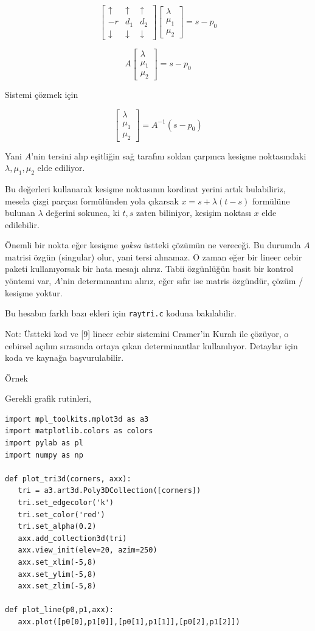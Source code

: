 \documentclass[12pt,fleqn]{article}\usepackage{../../common}
\begin{document}
$$
\left[\begin{array}{ccc}
\uparrow & \uparrow & \uparrow  \\
 -r & d_1 & d_2 \\
\downarrow & \downarrow & \downarrow 
\end{array}\right]
\left[\begin{array}{ccc}
\lambda \\ \mu_1 \\ \mu_2 
\end{array}\right] = s - p_0
$$

$$
A
\left[\begin{array}{ccc}
\lambda \\ \mu_1 \\ \mu_2 
\end{array}\right] = s - p_0
$$

Sistemi çözmek için

$$
\left[\begin{array}{ccc}
\lambda \\ \mu_1 \\ \mu_2 
\end{array}\right] = A^{-1} (s - p_0)
$$

Yani $A$'nin tersini alıp eşitliğin sağ tarafını soldan çarpınca kesişme
noktasındaki $\lambda,\mu_1,\mu_2$ elde ediliyor.

Bu değerleri kullanarak kesişme noktasının kordinat yerini artık bulabiliriz,
mesela çizgi parçası formülünden yola çıkarsak $x = s + \lambda (t-s)$ formülüne
bulunan $\lambda$ değerini sokunca, ki $t,s$ zaten biliniyor, kesişim noktası
$x$ elde edilebilir.

Önemli bir nokta eğer kesişme {\em yoksa} üstteki çözümün ne vereceği. Bu
durumda $A$ matrisi özgün (singular) olur, yani tersi alınamaz. O zaman eğer bir
lineer cebir paketi kullanıyorsak bir hata mesajı alırız. Tabii özgünlüğün basit
bir kontrol yöntemi var, $A$'nin determınantını alırız, eğer sıfır ise matris
özgündür, çözüm / kesişme yoktur.

Bu hesabın farklı bazı ekleri için  \verb!raytri.c! koduna bakılabilir.

Not: Üstteki kod ve [9] lineer cebir sistemini Cramer'in Kuralı ile çözüyor, o
cebirsel açılım sırasında ortaya çıkan determinantlar kullanılıyor. Detaylar
için koda ve kaynağa başvurulabilir.

Örnek

Gerekli grafik rutinleri,

\begin{verbatim}
import mpl_toolkits.mplot3d as a3
import matplotlib.colors as colors
import pylab as pl
import numpy as np

def plot_tri3d(corners, axx):
   tri = a3.art3d.Poly3DCollection([corners])   
   tri.set_edgecolor('k')
   tri.set_color('red')
   tri.set_alpha(0.2)
   axx.add_collection3d(tri)
   axx.view_init(elev=20, azim=250)
   axx.set_xlim(-5,8)
   axx.set_ylim(-5,8)
   axx.set_zlim(-5,8)

def plot_line(p0,p1,axx):
   axx.plot([p0[0],p1[0]],[p0[1],p1[1]],[p0[2],p1[2]])
   
\end{verbatim}
\end{document}
